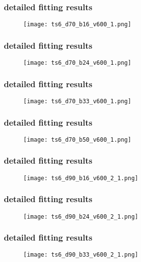 	\begin{frame}
		\frametitle{\appendixname{} \textendash{} detailed fitting results}
		\begin{figure}
			\texttt{[image: ts6\_d70\_b16\_v600\_1.png]}
		\end{figure}
	\end{frame}

	\begin{frame}
		\frametitle{\appendixname{} \textendash{} detailed fitting results}
		\begin{figure}
			\texttt{[image: ts6\_d70\_b24\_v600\_1.png]}
		\end{figure}
	\end{frame}

	\begin{frame}
		\frametitle{\appendixname{} \textendash{} detailed fitting results}
		\begin{figure}
			\texttt{[image: ts6\_d70\_b33\_v600\_1.png]}
		\end{figure}
	\end{frame}

	\begin{frame}
		\frametitle{\appendixname{} \textendash{} detailed fitting results}
		\begin{figure}
			\texttt{[image: ts6\_d70\_b50\_v600\_1.png]}
		\end{figure}
	\end{frame}

	\begin{frame}
		\frametitle{\appendixname{} \textendash{} detailed fitting results}
		\begin{figure}
			\texttt{[image: ts6\_d90\_b16\_v600\_2\_1.png]}
		\end{figure}
	\end{frame}

	\begin{frame}
		\frametitle{\appendixname{} \textendash{} detailed fitting results}
		\begin{figure}
			\texttt{[image: ts6\_d90\_b24\_v600\_2\_1.png]}
		\end{figure}
	\end{frame}

	\begin{frame}
		\frametitle{\appendixname{} \textendash{} detailed fitting results}
		\begin{figure}
			\texttt{[image: ts6\_d90\_b33\_v600\_2\_1.png]}
		\end{figure}
	\end{frame}

